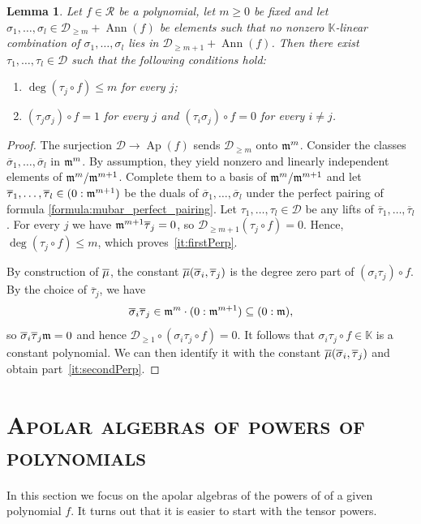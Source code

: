 \documentclass[a4paper,11pt,reqno]{amsart}
\newcommand{\calD}{\mathcal{D}}
\newcommand{\calR}{\mathcal{R}}
\newcommand{\bbK}{\mathbb{K}}
\DeclareMathOperator{\Ann}{Ann}
\DeclareMathOperator{\Ap}{Ap}
\numberwithin{equation}{section}
\theoremstyle{definition}
\theoremstyle{plain}
\newtheorem{lem}[defn]{Lemma}
\theoremstyle{remark}
\begin{document}
\begin{lem}\label{ref:dualElement:lem}
    Let $f\in \calR$ be a polynomial, let $m\geq 0$ be fixed and let
    $\sigma_1, \ldots ,\sigma_{l}\in \calD_{\geq m} + \Ann(f)$ be elements
    such that no nonzero $\bbK$-linear combination of $\sigma_1, \ldots
    ,\sigma_l$ lies in $\calD_{\geq m+1} + \Ann(f)$.
    Then there exist $\tau_1, \ldots ,\tau_l\in \calD$ such that {the following conditions hold:}
    \begin{enumerate}[label=(\arabic*), left= 3pt, widest=2,nosep]
        \item\label{it:firstPerp} $\deg(\tau_j\circ f)\leq m$ for every $j$;
        \item\label{it:secondPerp} $(\tau_j\sigma_j)\circ f = 1$ for every $j$ and $(\tau_i
            \sigma_j)\circ f = 0$ for every $i\neq j$.
    \end{enumerate}
\end{lem}
\begin{proof}
    \def\sigmabar{\overline{\sigma}}%
    \def\taubar{\overline{\tau}}%
    The surjection $\calD\to \Ap(f)$ sends $\calD_{\geq m}$ onto $\mathfrak{m}^m$.
    Consider the classes $\sigmabar_1, \ldots ,\sigmabar_l$ in $\mathfrak{m}^m$. By
    assumption, they yield nonzero and linearly independent elements of
    $\mathfrak{m}^m/\mathfrak{m}^{m+1}$. Complete them to a basis of $\mathfrak{m}^m/\mathfrak{m}^{m+1}$ and let
    $\taubar_1, \ldots ,\taubar_l\in (0:\mm^{m+1})$ be the duals of
    $\sigmabar_1, \ldots ,\sigmabar_l$ under the perfect pairing of formula \eqref{formula:mubar_perfect_pairing}.
    Let $\tau_1, \ldots ,\tau_l\in \calD$ be any lifts of $\taubar_1, \ldots
    ,\taubar_l$. For every $j$ we have $\mm^{m+1}\taubar_j = 0$, so
    $\calD_{\geq m+1} (\tau_j\circ f) = 0$. Hence, $\deg(\tau_j \circ f)\leq
    m$, which proves~\ref{it:firstPerp}.

    By construction of $\overline{\mu}$, the constant $\mubar(\sigmabar_i ,\taubar_j)$ is the degree
    zero part of $(\sigma_i\tau_j)\circ f$. By the choice of $\taubar_j$, we
    have
    \[\sigmabar_i\taubar_j \in \mm^m\cdot (0:\mm^{m+1}) \subseteq     (0:\mm),\] so
    $\sigmabar_i\taubar_j\mm = 0$ and hence
    $\calD_{\geq 1}\circ (\sigma_i\tau_j \circ f) = 0$. It follows that
    $\sigma_i\tau_j\circ f\in \bbK$ is a constant polynomial. We can then
    identify it with the constant $\mubar(\sigmabar_i, \taubar_j)$ and obtain
    part~\ref{it:secondPerp}.
\end{proof}

\section{\normalfont \scshape{}\selectfont Apolar algebras of powers of
polynomials}
\noindent In this section we focus on the apolar algebras {of the powers of} of a given
polynomial $f$. It turns out that it is easier to start with the tensor
powers.
\end{document}
